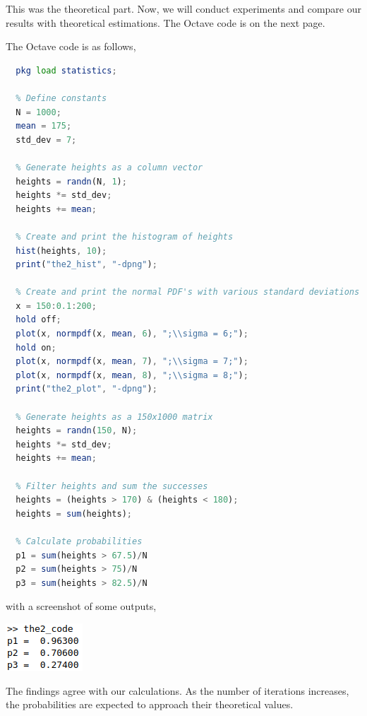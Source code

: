 \documentclass[12pt]{article}
\begin{document}
\noindent
This was the theoretical part. Now, we will conduct experiments and compare our
results with theoretical estimations. The Octave code is on the next page.

\newpage

\noindent
The Octave code is as follows,
\begin{lstlisting}[language=Octave]
  % Load statistics module for normal probability density function
  pkg load statistics;

  % Define constants
  N = 1000;
  mean = 175;
  std_dev = 7;

  % Generate heights as a column vector
  heights = randn(N, 1);
  heights *= std_dev;
  heights += mean;

  % Create and print the histogram of heights
  hist(heights, 10);
  print("the2_hist", "-dpng");

  % Create and print the normal PDF's with various standard deviations
  x = 150:0.1:200;
  hold off;
  plot(x, normpdf(x, mean, 6), ";\\sigma = 6;");
  hold on;
  plot(x, normpdf(x, mean, 7), ";\\sigma = 7;");
  plot(x, normpdf(x, mean, 8), ";\\sigma = 8;");
  print("the2_plot", "-dpng");

  % Generate heights as a 150x1000 matrix
  heights = randn(150, N);
  heights *= std_dev;
  heights += mean;

  % Filter heights and sum the successes
  heights = (heights > 170) & (heights < 180);
  heights = sum(heights);

  % Calculate probabilities
  p1 = sum(heights > 67.5)/N
  p2 = sum(heights > 75)/N
  p3 = sum(heights > 82.5)/N
\end{lstlisting}

\noindent
with a screenshot of some outputs,

\begin{center}
  \includegraphics[scale = 1]{the2_outputs.png}
\end{center}

\noindent
The findings agree with our calculations. As the number of iterations increases,
the probabilities are expected to approach their theoretical values.
\end{document}
